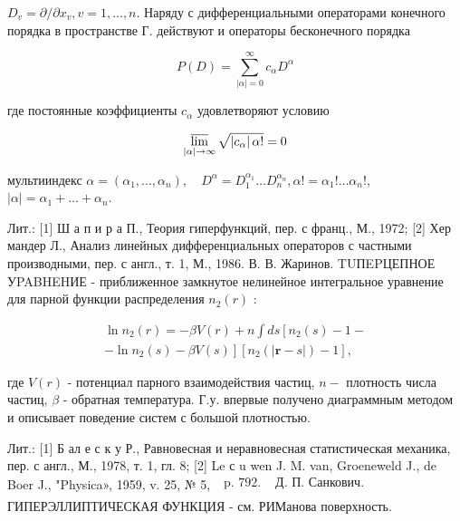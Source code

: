 \documentclass[10pt]{article}
\begin{document}
$D_{v}=\partial / \partial x_{v}, v=1, \ldots, n$. Наряду с дифференциальными операторами конечного порядка в пространстве Г. действуют и операторы бесконечного порядка



\[

P(D)=\sum_{|\alpha|=0}^{\infty} c_{\alpha} D^{\alpha}

\]



где постоянные коэффициенты $c_{\alpha}$ удовлетворяют условию



\[

\varlimsup_{|\alpha| \rightarrow \infty} \sqrt{\left|c_{\alpha}\right| \alpha !}=0

\]



мультииндекс $\alpha=\left(\alpha_{1}, \ldots, \alpha_{n}\right), \quad D^{\alpha}=D_{1}^{\alpha_{1}} \ldots D_{n}^{\alpha_{n}}, \alpha !=\alpha_{1} ! \ldots \alpha_{n} !$, $|\alpha|=\alpha_{1}+\ldots+\alpha_{n}$.



Лит.: [1] Ш а п и р а П., Теория гиперфункций, пер. с франц., М., 1972; [2] Хер мандер Л., Анализ линейных дифференциальных операторов с частными производными, пер. с англ., т. 1, М., 1986. В. В. Жаринов. TUПEPЦЕПНОЕ УPABHEHИЕ - приближенное замкнутое нелинейное интегральное уравнение для парной функции распределения $n_{2}(r)$ :



\[

\begin{gathered}

\ln n_{2}(r)=-\beta V(r)+n \int d s\left[n_{2}(s)-1-\right. \\

\left.-\ln n_{2}(s)-\beta V(s)\right]\left[n_{2}(|\boldsymbol{r}-s|)-1\right],

\end{gathered}

\]



где $V(r)$ - потенциал парного взаимодействия частиц, $n-$ плотность числа частиц, $\beta$ - обратная температура. Г.у. впервые получено диаграммным методом и описывает поведение систем с большой плотностью.



Лит.: [1] Б ал е с к у Р., Равновесная и неравновесная статистическая механика, пер. с англ., М., 1978, т. 1, гл. 8; [2] Le с u wen J. M. van, Groeneweld J., de Boer J., "Physica», 1959, v. 25, № 5, $\begin{array}{ll}\text { p. } 792 . & \text { Д. П. Санкович. } \\ \end{array}$ ГИПЕРЭЛЛИПТИЧЕСКАЯ ФУНКЦИЯ - см. РИМанова поверхность.
\end{document}
